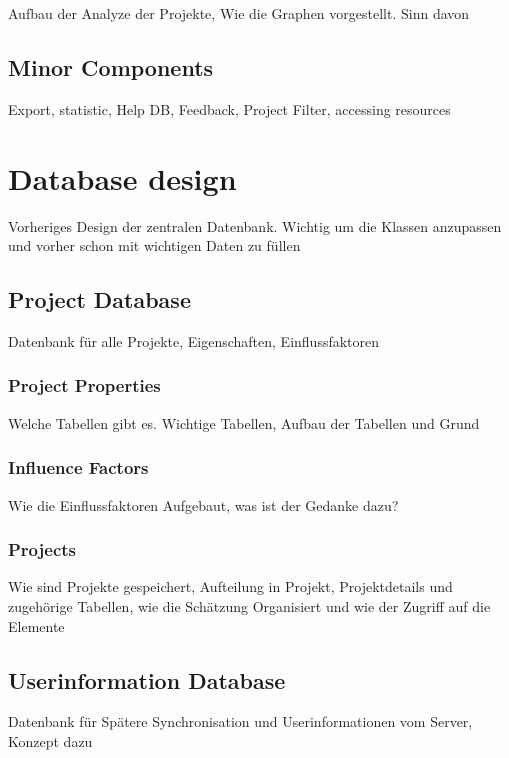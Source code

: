 Aufbau der Analyze der Projekte, Wie die Graphen vorgestellt. Sinn davon

\subsection{Minor Components}

Export, statistic, Help DB, Feedback, Project Filter, accessing resources


\section{Database design}

Vorheriges Design der zentralen Datenbank. Wichtig um die Klassen anzupassen und vorher schon mit wichtigen Daten zu füllen

\subsection{Project Database}

Datenbank für alle Projekte, Eigenschaften, Einflussfaktoren

\subsubsection{Project Properties}

Welche Tabellen gibt es. Wichtige Tabellen, Aufbau der Tabellen und Grund

\subsubsection{Influence Factors}

Wie die Einflussfaktoren Aufgebaut, was ist der Gedanke dazu?

\subsubsection{Projects}

Wie sind Projekte gespeichert, Aufteilung in Projekt, Projektdetails und zugehörige Tabellen, wie die Schätzung Organisiert und wie der Zugriff auf die Elemente

\subsection{Userinformation Database}

Datenbank für Spätere Synchronisation und Userinformationen vom Server, Konzept dazu

